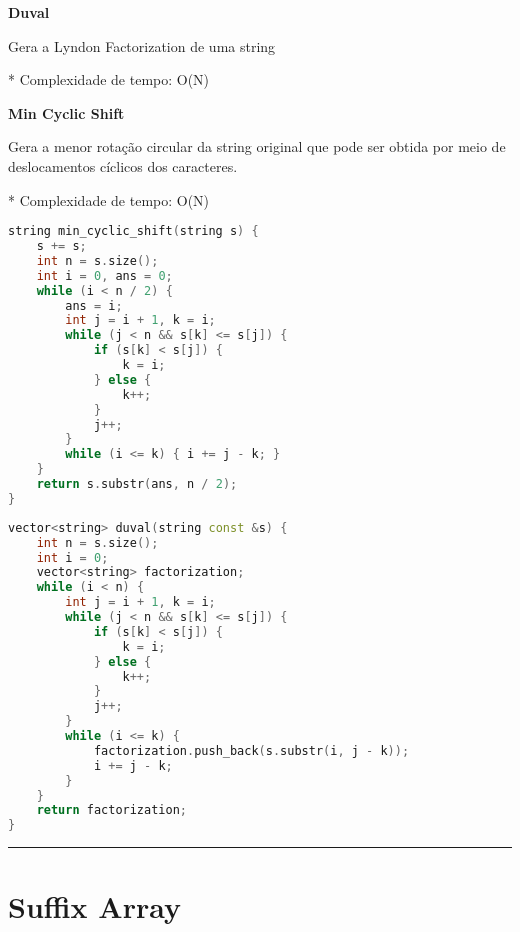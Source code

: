 \documentclass[11pt, a4paper, twoside]{book}
\begin{document}
\textbf{Duval} 



Gera a Lyndon Factorization de uma string



* Complexidade de tempo: O(N)



\textbf{Min Cyclic Shift} 



Gera a menor rotação circular da string original que pode ser obtida por meio de deslocamentos cíclicos dos caracteres.



* Complexidade de tempo: O(N)




\hfill

\begin{multicols}{2}
\begin{lstlisting}[language=C++]
string min_cyclic_shift(string s) {
    s += s;
    int n = s.size();
    int i = 0, ans = 0;
    while (i < n / 2) {
        ans = i;
        int j = i + 1, k = i;
        while (j < n && s[k] <= s[j]) {
            if (s[k] < s[j]) {
                k = i;
            } else {
                k++;
            }
            j++;
        }
        while (i <= k) { i += j - k; }
    }
    return s.substr(ans, n / 2);
}
\end{lstlisting}
\end{multicols}

\hfill

\begin{lstlisting}[language=C++]
vector<string> duval(string const &s) {
    int n = s.size();
    int i = 0;
    vector<string> factorization;
    while (i < n) {
        int j = i + 1, k = i;
        while (j < n && s[k] <= s[j]) {
            if (s[k] < s[j]) {
                k = i;
            } else {
                k++;
            }
            j++;
        }
        while (i <= k) {
            factorization.push_back(s.substr(i, j - k));
            i += j - k;
        }
    }
    return factorization;
}
\end{lstlisting}

\hfill

\rule{\textwidth}{0.4pt}

\section{Suffix Array}
\end{document}

